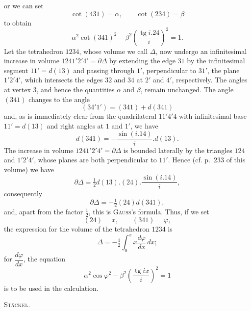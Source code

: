 %
\noindent or we can set
\[
\cot(431)=\alpha,\qquad\cot(234)=\beta
\]
to obtain
\[
\alpha^{2}\cot(341)^{2}-\beta^{2}\left(\frac{\operatorname{tg}i.24}{i}\right)^{2}=1.
\]
Let the tetrahedron $1234$, whose volume we call $\Delta$, now undergo an infinitesimal increase in volume $1241'2'4'=\partial\Delta$ by extending the edge $31$ by the infinitesimal segment $11'=d(13)$ and passing through $1'$, perpendicular to $31'$, the plane $1'2'4'$, which intersects the edges $32$ and $34$ at $2'$ and $4'$, respectively. The angles at vertex $3$, and hence the quantities $\alpha$ and $\beta$, remain unchanged. The angle $(341)$ changes to the angle
\[
(34'1')=(341)+d(341)
\]
and, as is immediately clear from the quadrilateral $11'4'4$ with infinitesimal base $11'=d(13)$ and right angles at $1$ and $1'$, we have
\[
d(341)=-\frac{\sin(i.14)}{i}.d(13).
\]
The increase in volume $1241'2'4'=\partial\Delta$ is bounded laterally by the triangles $124$ and $1'2'4'$, whose planes are both perpendicular to $11'$. Hence (cf. p.~233 of this volume) we have
\[
\partial\Delta=\tfrac{1}{2}d(13).(24).\frac{\sin(i.14)}{i},
\]
consequently
\[
\partial\Delta=-\tfrac{1}{2}(24)d(341),
\]
and, apart from the factor $\tfrac{1}{2}$, this is \textsc{Gauss}'s formula. Thus, if we set
\[
(24)=x,\qquad(341)=\varphi,
\]
the expression for the volume of the tetrahedron $1234$ is
\[
\Delta=-\tfrac{1}{2}\int_{0}^{x}x\frac{d\varphi}{dx}\,dx;
\]
for $\dfrac{d\varphi}{dx}$, the equation
\[
\alpha^{2}\cos\varphi^{2}-\beta^{2}\left(\frac{\operatorname{tg}ix}{i}\right)^{2}=1
\]
is to be used in the calculation.
\begin{flushright}\textsc{Stäckel.}\end{flushright}
\par\endgroup
